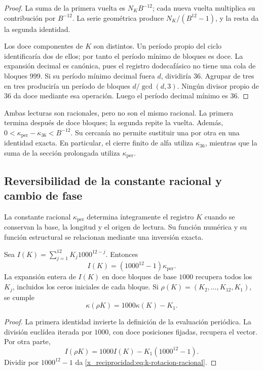 \begin{proof}
La suma de la primera vuelta es \(N_KB^{-12}\); cada nueva vuelta
multiplica su contribución por \(B^{-12}\). La serie geométrica produce
\(N_K/(B^{12}-1)\), y la resta da la segunda identidad.

Los doce componentes de \(K\) son distintos. Un período propio del ciclo
identificaría dos de ellos; por tanto el período mínimo de bloques es
doce. La expansión decimal es canónica, pues el registro dodecafásico no tiene una cola
de bloques 999. Si su período mínimo decimal fuera \(d\), dividiría
36. Agrupar de tres en tres produciría un período de bloques
\(d/\gcd(d,3)\). Ningún divisor propio de 36 da doce mediante esa
operación. Luego el período decimal mínimo es 36.
\end{proof}

Ambas lecturas son racionales, pero no son el mismo racional. La primera
termina después de doce bloques; la segunda repite la vuelta. Además,
\(0<\kappa_{\mathrm{per}}-\kappa_{36}<B^{-12}\). Su cercanía no
permite sustituir una por otra en una identidad exacta. En particular,
el cierre finito de alfa utiliza \(\kappa_{36}\), mientras que la
suma de la sección prolongada utiliza \(\kappa_{\mathrm{per}}\).


\subsection{Reversibilidad de la constante racional y cambio de fase}

La constante racional \(\kappa_{\mathrm{per}}\) determina íntegramente
el registro \(K\) cuando se conservan la base, la longitud y el origen
de lectura. Su función numérica y su función estructural se relacionan
mediante una inversión exacta.

\begin{proposition}
Sea \(I(K)=\sum_{j=1}^{12}K_j1000^{12-j}\). Entonces
\[
 I(K)=(1000^{12}-1)\kappa_{\mathrm{per}}.
\]
La expansión entera de \(I(K)\) en doce bloques de base \(1000\)
recupera todos los \(K_j\), incluidos los ceros iniciales de cada bloque.
Si \(\rho(K)=(K_2,\ldots,K_{12},K_1)\), se cumple
\begin{equation}
 \kappa(\rho K)=1000\kappa(K)-K_1.
 \label{x_reciprocidad:eq:k-rotacion-racional}
\end{equation}
\end{proposition}
\begin{proof}
La primera identidad invierte la definición de la evaluación periódica.
La división euclídea iterada por \(1000\), con doce posiciones fijadas,
recupera el vector. Por otra parte,
\[
 I(\rho K)=1000I(K)-K_1(1000^{12}-1).
\]
Dividir por \(1000^{12}-1\) da \eqref{x_reciprocidad:eq:k-rotacion-racional}.
\end{proof}

